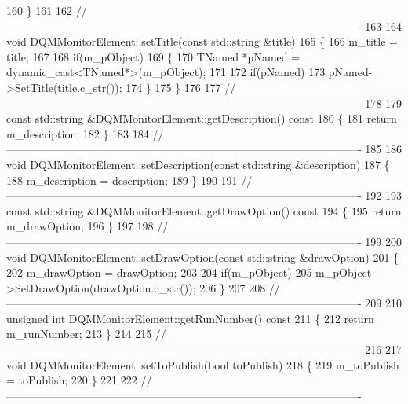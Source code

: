 \begin{DoxyCode}
160 \}
161 
162 \textcolor{comment}{//-------------------------------------------------------------------------------------------------}
163 
164 \textcolor{keywordtype}{void} DQMMonitorElement::setTitle(\textcolor{keyword}{const} std::string &title)
165 \{
166   m\_title = title;
167 
168   \textcolor{keywordflow}{if}(m\_pObject)
169   \{
170     TNamed *pNamed = \textcolor{keyword}{dynamic\_cast<}TNamed*\textcolor{keyword}{>}(m\_pObject);
171 
172     \textcolor{keywordflow}{if}(pNamed)
173       pNamed->SetTitle(title.c\_str());
174   \}
175 \}
176 
177 \textcolor{comment}{//-------------------------------------------------------------------------------------------------}
178 
179 \textcolor{keyword}{const} std::string &DQMMonitorElement::getDescription()\textcolor{keyword}{ const}
180 \textcolor{keyword}{}\{
181   \textcolor{keywordflow}{return} m\_description;
182 \}
183 
184 \textcolor{comment}{//-------------------------------------------------------------------------------------------------}
185 
186 \textcolor{keywordtype}{void} DQMMonitorElement::setDescription(\textcolor{keyword}{const} std::string &description)
187 \{
188   m\_description = description;
189 \}
190 
191 \textcolor{comment}{//-------------------------------------------------------------------------------------------------}
192 
193 \textcolor{keyword}{const} std::string &DQMMonitorElement::getDrawOption()\textcolor{keyword}{ const}
194 \textcolor{keyword}{}\{
195   \textcolor{keywordflow}{return} m\_drawOption;
196 \}
197 
198 \textcolor{comment}{//-------------------------------------------------------------------------------------------------}
199 
200 \textcolor{keywordtype}{void} DQMMonitorElement::setDrawOption(\textcolor{keyword}{const} std::string &drawOption)
201 \{
202   m\_drawOption = drawOption;
203 
204   \textcolor{keywordflow}{if}(m\_pObject)
205     m\_pObject->SetDrawOption(drawOption.c\_str());
206 \}
207 
208 \textcolor{comment}{//-------------------------------------------------------------------------------------------------}
209 
210 \textcolor{keywordtype}{unsigned} \textcolor{keywordtype}{int} DQMMonitorElement::getRunNumber()\textcolor{keyword}{ const}
211 \textcolor{keyword}{}\{
212   \textcolor{keywordflow}{return} m\_runNumber;
213 \}
214 
215 \textcolor{comment}{//-------------------------------------------------------------------------------------------------}
216 
217 \textcolor{keywordtype}{void} DQMMonitorElement::setToPublish(\textcolor{keywordtype}{bool} toPublish)
218 \{
219   m\_toPublish = toPublish;
220 \}
221 
222 \textcolor{comment}{//-------------------------------------------------------------------------------------------------}

\end{DoxyCode}

